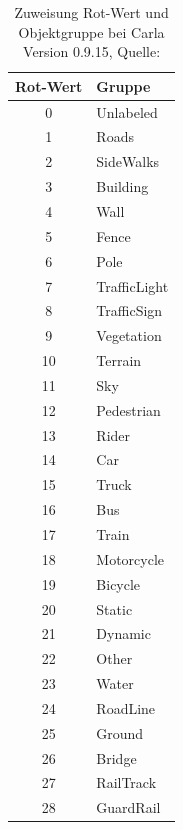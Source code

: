 \begin{table}[h]
    \begin{center}
    {\small %
    \begin{tabular}{c l}
        \toprule
        \textbf{Rot-Wert} & \textbf{Gruppe} \\
        \midrule
        0  & Unlabeled \\
        1  & Roads \\
        2  & SideWalks \\
        3  & Building \\
        4  & Wall \\
        5  & Fence \\
        6  & Pole \\
        7  & TrafficLight \\
        8  & TrafficSign \\
        9  & Vegetation \\
        10 & Terrain \\
        11 & Sky \\
        12 & Pedestrian \\
        13 & Rider \\
        14 & Car \\
        15 & Truck \\
        16 & Bus \\
        17 & Train \\
        18 & Motorcycle \\
        19 & Bicycle \\
        20 & Static \\
        21 & Dynamic \\
        22 & Other \\
        23 & Water \\
        24 & RoadLine \\
        25 & Ground \\
        26 & Bridge \\
        27 & RailTrack \\
        28 & GuardRail \\
        \bottomrule
    \end{tabular}
    }%
    \end{center}
    \caption{Zuweisung Rot-Wert und Objektgruppe bei Carla Version 0.9.15, Quelle: \cite{lit_website_carla_documentation}}\label{tab:rot_tag}
    
\end{table}



